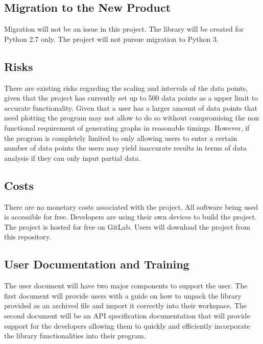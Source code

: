 \documentclass[12pt, titlepage]{article}
\begin{document}
\subsection{Migration to the New Product}
Migration will not be an issue in this project. The library will be created for Python 2.7 only. The project will not pursue migration to Python 3.
\subsection{Risks}
There are existing risks regarding the scaling and intervals of the data points, given that the project has currently set up to 500 data points as a upper limit to accurate functionality. Given that a user has a larger amount of data points that need plotting the program may not allow to do so without compromising the non functional requirement of generating graphs in reasonable timings. However, if the program is completely limited to only allowing users to enter a certain number of data points the users may yield inaccurate results in terms of data analysis if they can only input partial data.
\subsection{Costs}
There are no monetary costs associated with the project. All software being used is accessible for free. Developers are using their own devices to build the project. The project is hosted for free on GitLab. Users will download the project from this repository.
\subsection{User Documentation and Training}
The user document will have two major components to support the user. The first document will provide users with a guide on how to unpack the library provided as an archived file and import it correctly into their workspace. The second document will be an API specification documentation that will provide support for the developers allowing them to quickly and efficiently incorporate the library functionalities into their program.




\newpage

%
\end{document}
